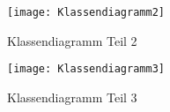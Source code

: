 \begin{figure}[h]
  \begin{center}
    \texttt{[image: Klassendiagramm2]}
  		  \caption{Klassendiagramm Teil 2}
     \label{KlassenDiagramm2}
  \end{center}
\end{figure}

\begin{figure}[h]
  \begin{center}
    \texttt{[image: Klassendiagramm3]}
  		  \caption{Klassendiagramm Teil 3}
     \label{KlassenDiagramm3}
  \end{center}
\end{figure}